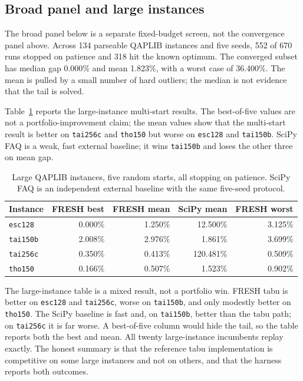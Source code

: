 \documentclass[pdflatex,sn-mathphys-num]{sn-jnl}
\begin{document}
\subsection{Broad panel and large instances}

The broad panel below is a separate fixed-budget screen, not the convergence panel above. Across 134
parseable QAPLIB instances and five seeds, 552 of 670 runs stopped on patience and 318 hit the known
optimum. The converged subset has median gap 0.000\% and mean 1.823\%, with a worst case of 36.400\%.
The mean is pulled by a small number of hard outliers; the median is not evidence that the tail is
solved.

Table~\ref{tab:qap-large} reports the large-instance multi-start results. The best-of-five values are
not a portfolio-improvement claim; the mean values show that the multi-start result is better on
\texttt{tai256c} and \texttt{tho150} but worse on \texttt{esc128} and \texttt{tai150b}. SciPy FAQ is a
weak, fast external baseline; it wins \texttt{tai150b} and loses the other three on mean gap.

\begin{table}[t]
\centering
\caption{Large QAPLIB instances, five random starts, all stopping on patience. SciPy FAQ is an
independent external baseline with the same five-seed protocol.}
\label{tab:qap-large}
\small
\begin{tabular}{lrrrr}
\toprule
Instance & FRESH best & FRESH mean & SciPy mean & FRESH worst \\
\midrule
\texttt{esc128} & 0.000\% & 1.250\% & 12.500\% & 3.125\% \\
\texttt{tai150b} & 2.008\% & 2.976\% & 1.861\% & 3.699\% \\
\texttt{tai256c} & 0.350\% & 0.413\% & 120.481\% & 0.509\% \\
\texttt{tho150} & 0.166\% & 0.507\% & 1.523\% & 0.902\% \\
\bottomrule
\end{tabular}
\end{table}

The large-instance table is a mixed result, not a portfolio win. FRESH tabu is better on
\texttt{esc128} and \texttt{tai256c}, worse on \texttt{tai150b}, and only modestly better on
\texttt{tho150}. The SciPy baseline is fast and, on \texttt{tai150b}, better than the tabu path; on
\texttt{tai256c} it is far worse. A best-of-five column would hide the tail, so the table reports both
the best and mean. All twenty large-instance incumbents replay exactly. The honest summary is that
the reference tabu implementation is competitive on some large instances and not on others, and that
the harness reports both outcomes.
\end{document}
